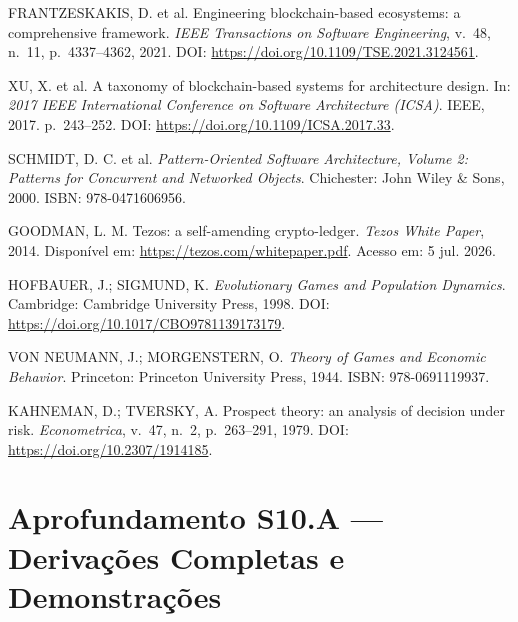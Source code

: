 \begin{enumerate}[{[1]}]
    \item \label{ref:frantzeskakis2021} FRANTZESKAKIS, D. et al. Engineering blockchain-based ecosystems: a comprehensive framework. \textit{IEEE Transactions on Software Engineering}, v.~48, n.~11, p.~4337--4362, 2021. DOI: \url{https://doi.org/10.1109/TSE.2021.3124561}.
    
    \item \label{ref:xu2016} XU, X. et al. A taxonomy of blockchain-based systems for architecture design. In: \textit{2017 IEEE International Conference on Software Architecture (ICSA)}. IEEE, 2017. p.~243--252. DOI: \url{https://doi.org/10.1109/ICSA.2017.33}.
    
    \item \label{ref:schmidt2000} SCHMIDT, D. C. et al. \textit{Pattern-Oriented Software Architecture, Volume 2: Patterns for Concurrent and Networked Objects}. Chichester: John Wiley \& Sons, 2000. ISBN: 978-0471606956.
    
    \item \label{ref:goodman2014} GOODMAN, L. M. Tezos: a self-amending crypto-ledger. \textit{Tezos White Paper}, 2014. Disponível em: \url{https://tezos.com/whitepaper.pdf}. Acesso em: 5 jul. 2026.
    
    \item \label{ref:hofbauer1998} HOFBAUER, J.; SIGMUND, K. \textit{Evolutionary Games and Population Dynamics}. Cambridge: Cambridge University Press, 1998. DOI: \url{https://doi.org/10.1017/CBO9781139173179}.
    
    \item \label{ref:vonneumann1944} VON NEUMANN, J.; MORGENSTERN, O. \textit{Theory of Games and Economic Behavior}. Princeton: Princeton University Press, 1944. ISBN: 978-0691119937.
    
    \item \label{ref:kahneman1979} KAHNEMAN, D.; TVERSKY, A. Prospect theory: an analysis of decision under risk. \textit{Econometrica}, v.~47, n.~2, p.~263--291, 1979. DOI: \url{https://doi.org/10.2307/1914185}.
\end{enumerate}


\section*{Aprofundamento S10.A --- Derivações Completas e Demonstrações}

